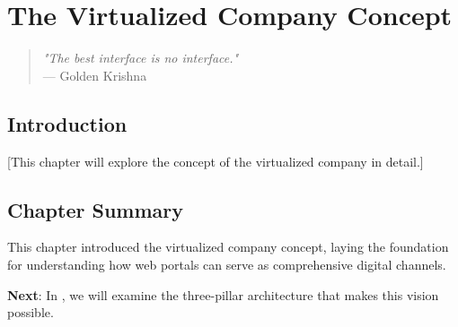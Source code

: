 
\chapter{The Virtualized Company Concept}
\label{chap:virtualized}

\begin{quote}
\textit{"The best interface is no interface."} \\
— Golden Krishna
\end{quote}

\section{Introduction}

[This chapter will explore the concept of the virtualized company in detail.]

\section{Chapter Summary}

This chapter introduced the virtualized company concept, laying the foundation for understanding how web portals can serve as comprehensive digital channels.

\textbf{Next}: In , we will examine the three-pillar architecture that makes this vision possible.
